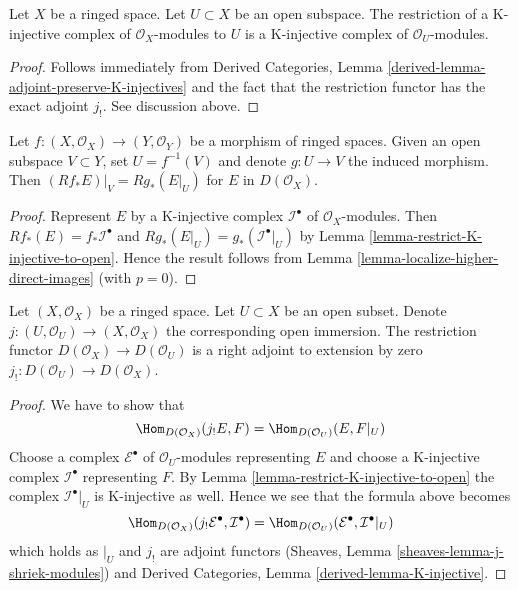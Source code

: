 \begin{lemma}
\label{lemma-restrict-K-injective-to-open}
Let $X$ be a ringed space. Let $U \subset X$ be an open subspace.
The restriction of a K-injective complex of $\mathcal{O}_X$-modules
to $U$ is a K-injective complex of $\mathcal{O}_U$-modules.
\end{lemma}

\begin{proof}
Follows immediately from
Derived Categories, Lemma \ref{derived-lemma-adjoint-preserve-K-injectives}
and the fact that the restriction functor has the
exact adjoint $j_!$. See discussion above.
\end{proof}

\begin{lemma}
\label{lemma-restrict-direct-image-open}
Let $f : (X, \mathcal{O}_X) \to (Y, \mathcal{O}_Y)$ be a morphism of ringed
spaces. Given an open subspace $V \subset Y$, set $U = f^{-1}(V)$ and denote
$g : U \to V$ the induced morphism. Then
$(Rf_*E)|_V = Rg_*(E|_U)$ for $E$ in $D(\mathcal{O}_X)$.
\end{lemma}

\begin{proof}
Represent $E$ by a K-injective complex $\mathcal{I}^\bullet$ of
$\mathcal{O}_X$-modules. Then $Rf_*(E) = f_*\mathcal{I}^\bullet$
and $Rg_*(E|_U) = g_*(\mathcal{I}^\bullet|_U)$ by
Lemma \ref{lemma-restrict-K-injective-to-open}.
Hence the result follows from Lemma \ref{lemma-localize-higher-direct-images}
(with $p = 0$).
\end{proof}

\begin{lemma}
\label{lemma-adjoint-lower-shriek-restrict}
Let $(X, \mathcal{O}_X)$ be a ringed space. Let $U \subset X$ be an
open subset. Denote $j : (U, \mathcal{O}_U) \to (X, \mathcal{O}_X)$
the corresponding open immersion. The restriction functor
$D(\mathcal{O}_X) \to D(\mathcal{O}_U)$ is a right adjoint to
extension by zero $j_! : D(\mathcal{O}_U) \to D(\mathcal{O}_X)$.
\end{lemma}

\begin{proof}
We have to show that
$$
\Hom_{D(\mathcal{O}_X)}(j_!E, F) = \Hom_{D(\mathcal{O}_U)}(E, F|_U)
$$
Choose a complex $\mathcal{E}^\bullet$ of $\mathcal{O}_U$-modules
representing $E$ and choose
a K-injective complex $\mathcal{I}^\bullet$ representing $F$.
By Lemma \ref{lemma-restrict-K-injective-to-open} the complex
$\mathcal{I}^\bullet|_U$ is K-injective as well. Hence we see that
the formula above becomes
$$
\Hom_{D(\mathcal{O}_X)}(j_!\mathcal{E}^\bullet, \mathcal{I}^\bullet) =
\Hom_{D(\mathcal{O}_U)}(\mathcal{E}^\bullet, \mathcal{I}^\bullet|_U)
$$
which holds as $|_U$ and $j_!$ are adjoint functors
(Sheaves, Lemma \ref{sheaves-lemma-j-shriek-modules}) and
Derived Categories, Lemma \ref{derived-lemma-K-injective}.
\end{proof}

